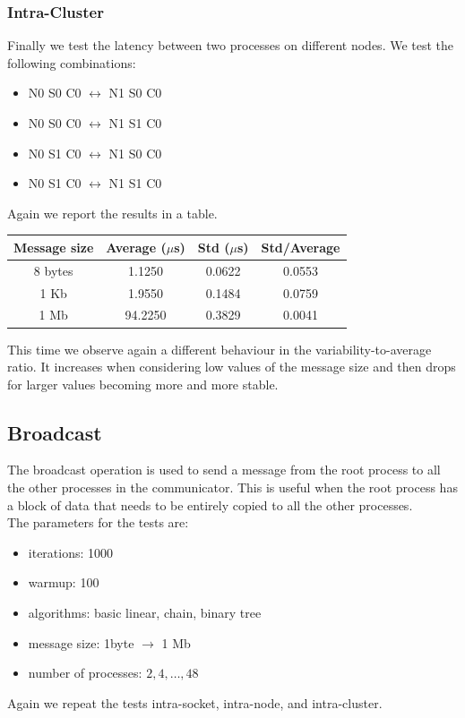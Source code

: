 \subsubsection{Intra-Cluster}
    Finally we test the latency between two processes on different nodes.
    We test the following combinations:
    \begin{itemize}
        \item N0 S0 C0 $\leftrightarrow$ N1 S0 C0
        \item N0 S0 C0 $\leftrightarrow$ N1 S1 C0
        \item N0 S1 C0 $\leftrightarrow$ N1 S0 C0
        \item N0 S1 C0 $\leftrightarrow$ N1 S1 C0
    \end{itemize}
    Again we report the results in a table.
    \begin{table}[H]
        \centering
        \begin{tabular}{|c|c|c|c|}
            \hline
            \textbf{Message size} & \textbf{Average ($\mu$s)} & \textbf{Std ($\mu$s)} & \textbf{Std/Average} \\
            \hline
            8 bytes & 1.1250 & 0.0622 & 0.0553 \\
            1 Kb & 1.9550 & 0.1484 & 0.0759 \\
            1 Mb & 94.2250 & 0.3829 & 0.0041 \\
            \hline
        \end{tabular}
    \end{table}
    This time we observe again a different behaviour in the variability-to-average
    ratio. It increases when considering low values of the message size and
    then drops for larger values becoming more and more stable.

\subsection{Broadcast}
    The broadcast operation is used to send a message from the root
    process to all the other processes in the communicator. 
    This is useful when the root process has a block of data that needs
    to be entirely copied to all the other processes. \\
    The parameters for the tests are:
    \begin{itemize}
        \item iterations: 1000
        \item warmup: 100
        \item algorithms: basic linear, chain, binary tree
        \item message size: 1byte $\rightarrow$ 1 Mb
        \item number of processes: $2, 4, \dots, 48$
    \end{itemize}
    Again we repeat the tests intra-socket, intra-node, and intra-cluster.
